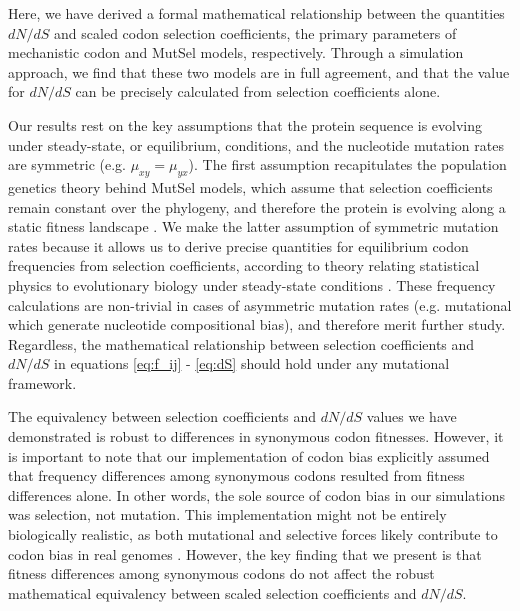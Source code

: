 \documentclass[11pt]{article}
\begin{document}
Here, we have derived a formal mathematical relationship between the quantities $dN/dS$ and scaled codon selection coefficients, the primary parameters of mechanistic codon and MutSel models, respectively. Through a simulation approach, we find that these two models are in full agreement, and that the value for $dN/dS$ can be precisely calculated from selection coefficients alone.

Our results rest on the key assumptions that the protein sequence is evolving under steady-state, or equilibrium, conditions, and the nucleotide mutation rates are symmetric (e.g. $\mu_{xy} = \mu_{yx}$). The first assumption recapitulates the population genetics theory behind MutSel models, which assume that selection coefficients remain constant over the phylogeny, and therefore the protein is evolving along a static fitness landscape \cite{HalpernBruno1998,Rodrigueetal2010,Tamurietal2012}. We make the latter assumption of symmetric mutation rates because it allows us to derive precise quantities for equilibrium codon frequencies from selection coefficients, according to theory relating statistical physics to evolutionary biology under steady-state conditions \cite{SellaHirsh2005,deVladar2011}. These frequency calculations are non-trivial in cases of asymmetric mutation rates (e.g. mutational which generate nucleotide compositional bias), and therefore merit further study. Regardless, the mathematical relationship between selection coefficients and $dN/dS$ in equations \eqref{eq:f_ij} - \eqref{eq:dS} should hold under any mutational framework.

The equivalency between selection coefficients and $dN/dS$ values we have demonstrated is robust to differences in synonymous codon fitnesses. However, it is important to note that our implementation of codon bias explicitly assumed that frequency differences among synonymous codons resulted from fitness differences alone. In other words, the sole source of codon bias in our simulations was selection, not mutation. This implementation might not be entirely biologically realistic, as both mutational and selective forces likely contribute to codon bias in real genomes \cite{Blumer1991, Duret2002, HershbergPetrov2008, PlotkinKudla2010}. However, the key finding that we present is that fitness differences among synonymous codons do not affect the robust mathematical equivalency between scaled selection coefficients and $dN/dS$. 
\end{document}
